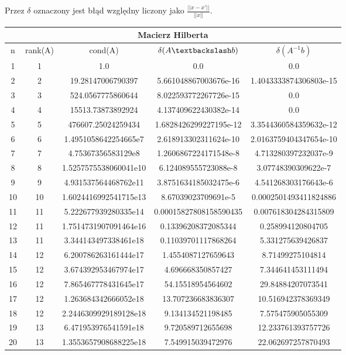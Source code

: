 \documentclass[a4paper]{article}
\begin{document}
Przez $\delta$ oznaczony jest błąd względny liczony jako $ \frac{||x - x'||}{||x||}$.
\begin{center}
 \begin{tabular}{ |c | c | c | c | c|  }
 \hline
 \multicolumn{5}{|c|}{Macierz Hilberta} \\
 \hline
 n & rank(A) & cond(A) & $\delta (A\textbackslash b)$ & $\delta (A^{-1}b)$ \\
 \hline
 1 & 1 & 1.0 & 0.0 & 0.0 \\
2 & 2 & 19.28147006790397 & 5.661048867003676e-16 & 1.4043333874306803e-15 \\
3 & 3 & 524.0567775860644 & 8.022593772267726e-15 & 0.0 \\
4 & 4 & 15513.73873892924 & 4.137409622430382e-14 & 0.0 \\
5 & 5 & 476607.25024259434 & 1.6828426299227195e-12 & 3.3544360584359632e-12 \\
6 & 6 & 1.4951058642254665e7 & 2.618913302311624e-10 & 2.0163759404347654e-10 \\
7 & 7 & 4.75367356583129e8 & 1.2606867224171548e-8 & 4.713280397232037e-9 \\
8 & 8 & 1.5257575538060041e10 & 6.124089555723088e-8 & 3.07748390309622e-7 \\
9 & 9 & 4.931537564468762e11 & 3.8751634185032475e-6 & 4.541268303176643e-6 \\
10 & 10 & 1.6024416992541715e13 & 8.67039023709691e-5 & 0.0002501493411824886 \\
11 & 11 & 5.222677939280335e14 & 0.00015827808158590435 & 0.007618304284315809 \\
12 & 11 & 1.7514731907091464e16 & 0.13396208372085344 & 0.258994120804705 \\
13 & 11 & 3.344143497338461e18 & 0.11039701117868264 & 5.331275639426837 \\
14 & 12 & 6.200786263161444e17 & 1.4554087127659643 & 8.71499275104814 \\
15 & 12 & 3.674392953467974e17 & 4.696668350857427 & 7.344641453111494 \\
16 & 12 & 7.865467778431645e17 & 54.15518954564602 & 29.84884207073541 \\
17 & 12 & 1.263684342666052e18 & 13.707236683836307 & 10.516942378369349 \\
18 & 12 & 2.2446309929189128e18 & 9.134134521198485 & 7.575475905055309 \\
19 & 13 & 6.471953976541591e18 & 9.720589712655698 & 12.233761393757726 \\
20 & 13 & 1.3553657908688225e18 & 7.549915039472976 & 22.062697257870493 \\
 \hline
\end{tabular}
\end{center}
\end{document}
